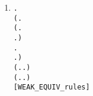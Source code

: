 \begin{enumerate}
\item \begin{alltt}
\HOLTokenTurnstile{} \HOLSymConst{\HOLTokenForall{}} .
       (\HOLSymConst{\HOLTokenForall{}}.
            (\HOLSymConst{\HOLTokenForall{}}.
                  \HOLTokenTransBegin{} \HOLTokenTransEnd {} \HOLSymConst{\HOLTokenImp{}}
                 \HOLSymConst{\HOLTokenExists{}}.  \HOLTokenWeakTransBegin{} \HOLTokenImp{}  \HOLSymConst{\HOLTokenConj{}}  \HOLSymConst{\HOLTokenWeakEQ} ) \HOLSymConst{\HOLTokenConj{}}
            \HOLSymConst{\HOLTokenForall{}}.
                 \HOLTokenTransBegin{} \HOLTokenTransEnd {} \HOLSymConst{\HOLTokenImp{}} \HOLSymConst{\HOLTokenExists{}}.  \HOLTokenWeakTransBegin{} \HOLTokenImp{}  \HOLSymConst{\HOLTokenConj{}}  \HOLSymConst{\HOLTokenWeakEQ} ) \HOLSymConst{\HOLTokenConj{}}
       (\HOLSymConst{\HOLTokenForall{}}.  \HOLTokenTransBegin\HOLSymConst{\ensuremath{\tau}}\HOLTokenTransEnd {} \HOLSymConst{\HOLTokenImp{}} \HOLSymConst{\HOLTokenExists{}}.  \HOLSymConst{\HOLTokenEPS}  \HOLSymConst{\HOLTokenConj{}}  \HOLSymConst{\HOLTokenWeakEQ} ) \HOLSymConst{\HOLTokenConj{}}
       (\HOLSymConst{\HOLTokenForall{}}.  \HOLTokenTransBegin\HOLSymConst{\ensuremath{\tau}}\HOLTokenTransEnd {} \HOLSymConst{\HOLTokenImp{}} \HOLSymConst{\HOLTokenExists{}}.  \HOLSymConst{\HOLTokenEPS}  \HOLSymConst{\HOLTokenConj{}}  \HOLSymConst{\HOLTokenWeakEQ} ) \HOLSymConst{\HOLTokenImp{}}
        \HOLSymConst{\HOLTokenWeakEQ} \hfill{[WEAK_EQUIV_rules]}

\end{alltt}
\end{enumerate}
